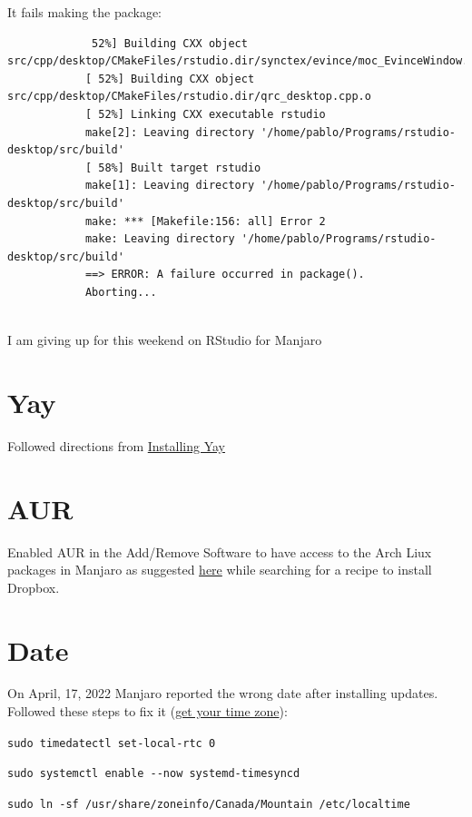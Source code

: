 \documentclass[]{scrartcl}
\begin{document}
	It fails making the package:
	
	\begin{tiny}
		\begin{verbatim}
			 52%] Building CXX object src/cpp/desktop/CMakeFiles/rstudio.dir/synctex/evince/moc_EvinceWindow.cpp.o
			[ 52%] Building CXX object src/cpp/desktop/CMakeFiles/rstudio.dir/qrc_desktop.cpp.o
			[ 52%] Linking CXX executable rstudio
			make[2]: Leaving directory '/home/pablo/Programs/rstudio-desktop/src/build'
			[ 58%] Built target rstudio
			make[1]: Leaving directory '/home/pablo/Programs/rstudio-desktop/src/build'
			make: *** [Makefile:156: all] Error 2
			make: Leaving directory '/home/pablo/Programs/rstudio-desktop/src/build'
			==> ERROR: A failure occurred in package().
			Aborting...
			
		\end{verbatim}
	\end{tiny}
	
	I am giving up for this weekend on RStudio for Manjaro
	
	
	
	\section{Yay}
	\label{sec:yay}
	
	Followed directions from \href{https://www.tecmint.com/install-yay-aur-helper-in-arch-linux-and-manjaro/}{Installing Yay}
	
	\section{AUR}
	
	Enabled AUR in the Add/Remove Software to have access to the Arch Liux packages in Manjaro as suggested \href{https://forum.manjaro.org/t/dropbox-install-new-to-manjaro/9576/5}{here} while searching for a recipe to install Dropbox.
	
	\section{Date}
	
	On April, 17, 2022 Manjaro reported the wrong date after installing updates.
	Followed these steps to fix it (\href{https://archived.forum.manjaro.org/t/howto-get-your-time-timezone-right-using-manjaro-windows-dual-boot/89359}{get your time zone}):
	\begin{compactenum}
		\item  \verb|sudo timedatectl set-local-rtc 0|
		\item \verb|sudo systemctl enable --now systemd-timesyncd|
		\item \verb|sudo ln -sf /usr/share/zoneinfo/Canada/Mountain /etc/localtime|
	\end{compactenum}
	
\end{document}
